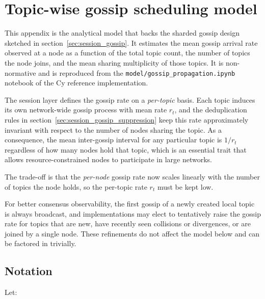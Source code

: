 \chapter{Topic-wise gossip scheduling model}\label{sec:appendix_gossip_model}

This appendix is the analytical model that backs the sharded gossip design
sketched in section~\ref{sec:session_gossip}. It estimates the mean gossip
arrival rate observed at a node as a function of the total topic count, the
number of topics the node joins, and the mean sharing multiplicity of those
topics. It is non-normative and is reproduced from the
\texttt{model/gossip\_propagation.ipynb} notebook of the Cy reference
implementation.

The session layer defines the gossip rate on a \emph{per-topic} basis. Each
topic induces its own network-wide gossip process with mean rate $r_t$, and
the deduplication rules in section~\ref{sec:session_gossip_suppression} keep
this rate approximately invariant with respect to the number of nodes sharing
the topic. As a consequence, the mean inter-gossip interval for any particular
topic is $1/r_t$ regardless of how many nodes hold that topic, which is an
essential trait that allows resource-constrained nodes to participate in large networks.

The trade-off is that the \emph{per-node} gossip rate now scales linearly
with the number of topics the node holds, so the per-topic rate $r_t$ must be
kept low.

\begin{remark}
    For better consensus observability, the first gossip of a newly created
    local topic is always broadcast, and implementations may elect to
    tentatively raise the gossip rate for topics that are new, have recently
    seen collisions or divergences, or are joined by a single node. These
    refinements do not affect the model below and can be factored in
    trivially.
\end{remark}

\section{Notation}

Let:

